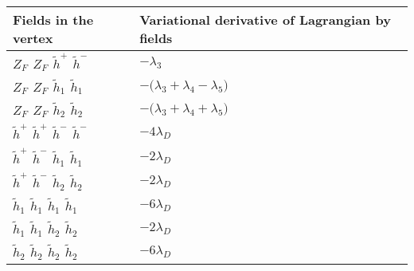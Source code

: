 \begin{center}
\begin{tabular}{|l|l|} \hline
Fields in the vertex & Variational derivative of Lagrangian by fields \\ \hline
$Z_F{}_{}$ \phantom{-} $Z_F{}_{}$ \phantom{-} $\widetilde{h}^+{}_{}$ \phantom{-} $\widetilde{h}^-{}_{}$ \phantom{-}  &
	$- \lambda_3$\\[2mm]
$Z_F{}_{}$ \phantom{-} $Z_F{}_{}$ \phantom{-} $\widetilde{h}_1{}_{}$ \phantom{-} $\widetilde{h}_1{}_{}$ \phantom{-}  &
	$-\big( \lambda_3+ \lambda_4- \lambda_5\big)$\\[2mm]
$Z_F{}_{}$ \phantom{-} $Z_F{}_{}$ \phantom{-} $\widetilde{h}_2{}_{}$ \phantom{-} $\widetilde{h}_2{}_{}$ \phantom{-}  &
	$-\big( \lambda_3+ \lambda_4+ \lambda_5\big)$\\[2mm]
$\widetilde{h}^+{}_{}$ \phantom{-} $\widetilde{h}^+{}_{}$ \phantom{-} $\widetilde{h}^-{}_{}$ \phantom{-} $\widetilde{h}^-{}_{}$ \phantom{-}  &
	$-4 \lambda_{D}$\\[2mm]
$\widetilde{h}^+{}_{}$ \phantom{-} $\widetilde{h}^-{}_{}$ \phantom{-} $\widetilde{h}_1{}_{}$ \phantom{-} $\widetilde{h}_1{}_{}$ \phantom{-}  &
	$-2 \lambda_{D}$\\[2mm]
$\widetilde{h}^+{}_{}$ \phantom{-} $\widetilde{h}^-{}_{}$ \phantom{-} $\widetilde{h}_2{}_{}$ \phantom{-} $\widetilde{h}_2{}_{}$ \phantom{-}  &
	$-2 \lambda_{D}$\\[2mm]
$\widetilde{h}_1{}_{}$ \phantom{-} $\widetilde{h}_1{}_{}$ \phantom{-} $\widetilde{h}_1{}_{}$ \phantom{-} $\widetilde{h}_1{}_{}$ \phantom{-}  &
	$-6 \lambda_{D}$\\[2mm]
$\widetilde{h}_1{}_{}$ \phantom{-} $\widetilde{h}_1{}_{}$ \phantom{-} $\widetilde{h}_2{}_{}$ \phantom{-} $\widetilde{h}_2{}_{}$ \phantom{-}  &
	$-2 \lambda_{D}$\\[2mm]
$\widetilde{h}_2{}_{}$ \phantom{-} $\widetilde{h}_2{}_{}$ \phantom{-} $\widetilde{h}_2{}_{}$ \phantom{-} $\widetilde{h}_2{}_{}$ \phantom{-}  &
	$-6 \lambda_{D}$\\ \hline
\end{tabular}

\end{center}


